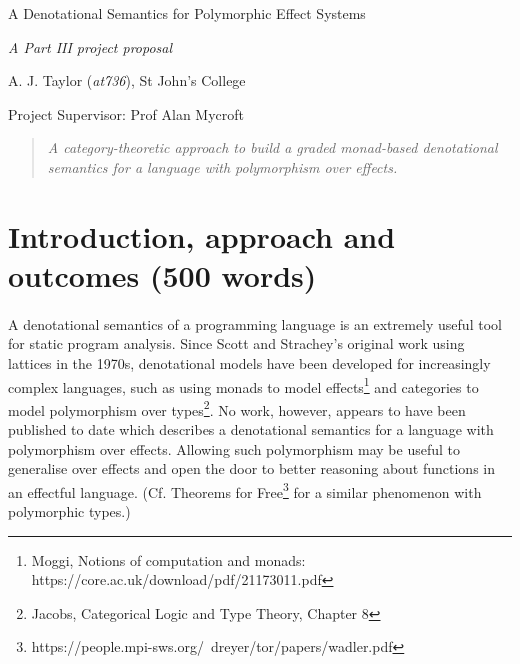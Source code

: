 \documentclass[11pt]{article}
\begin{document}
\centerline{\Large A Denotational Semantics for Polymorphic Effect Systems}
\vspace{2em}
\centerline{\Large \emph{A Part III project proposal}}
\vspace{2em}
\centerline{\large A. J. Taylor (\emph{at736}), St John's College}
\vspace{1em}
\centerline{\large Project Supervisor: Prof Alan Mycroft}
\vspace{1em}

\begin{abstract}
\textsl{
	A category-theoretic approach to build a graded monad-based denotational semantics for a language with polymorphism over effects.
} 
\end{abstract}

\section{Introduction, approach and outcomes (500 words)}
  
\paragraph{}{
A denotational semantics of a programming language is an extremely useful tool for static program analysis. Since Scott and Strachey's original work using lattices in the 1970s, denotational models have been developed for increasingly complex languages, such as using monads to model effects\footnote{Moggi, Notions of computation and monads: https://core.ac.uk/download/pdf/21173011.pdf} and categories to model polymorphism over types\footnote{ Jacobs, Categorical Logic and Type Theory, Chapter 8}. No work, however, appears to have been published to date which describes a denotational semantics for a language with polymorphism over effects. Allowing such polymorphism may be useful to generalise over effects and open the door to better reasoning about functions in an effectful language. (Cf. Theorems for Free\footnote{https://people.mpi-sws.org/~dreyer/tor/papers/wadler.pdf} for a similar phenomenon with polymorphic types.)}
\end{document}
